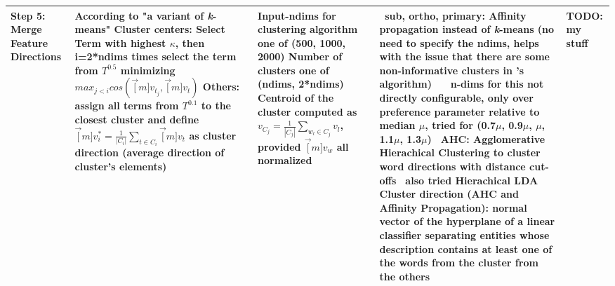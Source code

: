 {\begin{landscape}
\begin{table}[]
{\begin{tabular}{lllll}
			\textbf{Step 5: Merge Feature Directions} 
			&   
			\specialcell[l]{ According to \cite{Alshaikh2020} "a variant of \textit{k}-means" \\ Cluster centers: Select Term with highest $\kappa$, then i=2*ndims times select the term from $T^{0.5}$ minimizing $max_{j<i}cos(\vec[m]{v_{t_j}},\vec[m]{v_t})$ \\ 
				Others: assign all terms from $T^{0.1}$ to the closest cluster and define $\vec[m]{v^*_i} = \frac{1}{|C_i|} \sum_{t\in C_i} \vec[m]{v_t}$ as cluster direction (average direction of cluster's elements)} 
			&
			\specialcell[l]{Input-ndims for clustering algorithm one of (500, 1000, 2000) \\
			Number of clusters one of (ndims, 2*ndims) \\
				Centroid of the cluster computed as $v_{C_j} = \frac{1}{|C_j|}\sum_{w_l \in C_j} v_l$, provided $\vec[m]{v_w}$ all normalized} 
			& 
			\specialcell[l]{  \textbullet\, \textbf{sub, ortho, primary}:   
				Affinity propagation instead of \textit{k}-means (no need to specify the ndims, helps with the issue that there are some non-informative clusters in \cite{Derrac2015}'s algorithm) \\ ~~ n-dims for this not directly configurable, only over preference parameter relative to median $\mu$, tried for (0.7$\mu$, 0.9$\mu$, $\mu$, 1.1$\mu$, 1.3$\mu$) \\  \textbullet\, \textbf{AHC}: Agglomerative Hierachical Clustering to cluster word directions with distance cut-offs  \\ \textbullet\, also tried Hierachical LDA \\ Cluster direction (AHC and Affinity Propagation): normal vector of the hyperplane of a linear classifier separating entities whose description contains at least one of the words from the cluster from the others  } %
			&
			TODO: my stuff
			\\  \midrule


\end{tabular}}
\end{table}
\end{landscape}}
